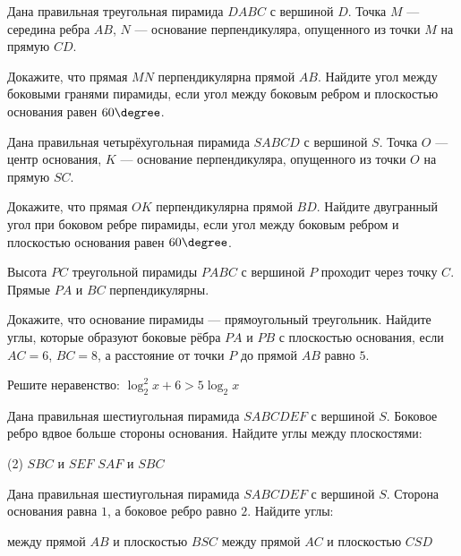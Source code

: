 \begin{class}[number=4]
	\begin{listofex}
		\item Дана правильная треугольная пирамида \(DABC\) с вершиной \(D\). Точка \(M\) --- середина ребра \(AB\), \(N\) --- основание перпендикуляра, опущенного из точки \(M\) на прямую \(CD\).
		\begin{tasks}
			\task Докажите, что прямая \(MN\) перпендикулярна прямой \(AB\).
			\task Найдите угол между боковыми гранями пирамиды, если угол между боковым ребром и плоскостью основания равен \(60\degree \).
		\end{tasks}
		\item Дана правильная четырёхугольная пирамида \(SABCD\) с вершиной \(S\). Точка \(O\) --- центр основания, \(K\) --- основание перпендикуляра, опущенного из точки \(O\) на прямую \(SC\).
		\begin{tasks}
			\task Докажите, что прямая \(OK\) перпендикулярна прямой \(BD\).
			\task Найдите двугранный угол при боковом ребре пирамиды, если угол между боковым ребром и плоскостью основания равен \(60\degree \).
		\end{tasks}
		\item Высота \(PC\) треугольной пирамиды \(PABC\) с вершиной \(P\) проходит через точку \(C\). Прямые \(PA\) и \(BC\) перпендикулярны.
		\begin{tasks}
			\task Докажите, что основание пирамиды --- прямоугольный треугольник.
			\task Найдите углы, которые образуют боковые рёбра \(PA\) и \(PB\) с плоскостью основания, если \(AC = 6\), \(BC = 8\), а расстояние от точки \(P\) до прямой \(AB\) равно \(5\).
		\end{tasks}
	\end{listofex}
\end{class}

\begin{homework}[number=2]
	\begin{listofex}
		\item Решите неравенство: \( \log_2^2x+6 > 5\log_2x \)
		\item Дана правильная шестиугольная пирамида \(SABCDEF\) с вершиной \(S\). Боковое ребро вдвое больше стороны основания. Найдите углы между плоскостями:
		\begin{tasks}(2)
			\task \( SBC \) и \(SEF\)
			\task \( SAF \) и \(SBC\)
		\end{tasks}
		\item Дана правильная шестиугольная пирамида \(SABCDEF\) с вершиной \(S\). Сторона основания равна \(1\), а боковое ребро равно \(2\). Найдите углы:
		\begin{tasks}
			\task между прямой \(AB\) и плоскостью \(BSC\)
			\task между прямой \(AC\) и плоскостью \(CSD\)
		\end{tasks}
	\end{listofex}
\end{homework}

